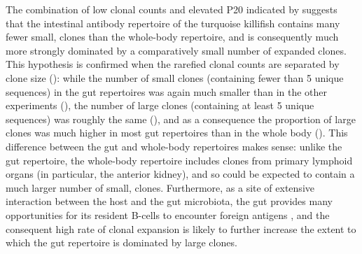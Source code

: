 The combination of low clonal counts and elevated P20 indicated by  suggests that the intestinal antibody repertoire of the turquoise killifish contains many fewer small, \naive clones than the whole-body repertoire, and is consequently much more strongly dominated by a comparatively small number of expanded clones. This hypothesis is confirmed when the rarefied clonal counts are separated by clone size (): while the number of small clones (containing fewer than 5 unique sequences) in the gut repertoires was again much smaller than in the other experiments (), the number of large clones (containing at least 5 unique sequences) was roughly the same (), and as a consequence the proportion of large clones was much higher in most gut repertoires than in the whole body (). This difference between the gut and whole-body repertoires makes sense: unlike the gut repertoire, the whole-body repertoire includes clones from primary lymphoid organs (in particular, the anterior kidney), and so could be expected to contain a much larger number of small, \naive clones. Furthermore, as a site of extensive interaction between the host and the gut microbiota, the gut provides many opportunities for its resident B-cells to encounter foreign antigens \parencite{caruso2009immunosenescence}, and the consequent high rate of clonal expansion is likely to further increase the extent to which the gut repertoire is dominated by large clones.

